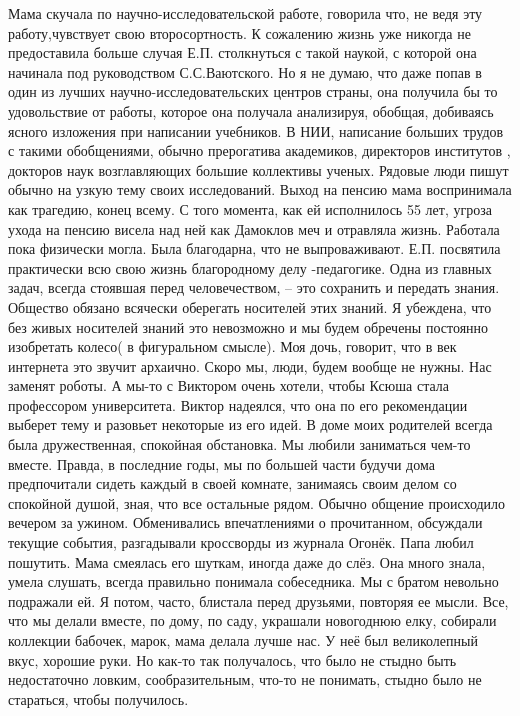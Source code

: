 Мама скучала по научно-исследовательской работе, говорила что, не ведя эту работу,чувствует свою второсортность. К сожалению жизнь уже никогда не предоставила больше случая Е.П. столкнуться с такой наукой, с которой она начинала под руководством С.С.Ваютского. Но я не думаю, что даже попав в один из лучших научно-исследовательских центров страны, она получила бы то удовольствие от работы, которое она получала анализируя, обобщая, добиваясь ясного изложения при написании учебников. В НИИ, написание больших трудов с такими обобщениями, обычно прерогатива академиков, директоров институтов , докторов наук возглавляющих большие коллективы ученых. Рядовые люди пишут обычно на узкую тему своих исследований.
Выход на пенсию мама воспринимала как трагедию, конец всему. С того момента, как ей исполнилось 55 лет, угроза ухода на пенсию висела над ней как Дамоклов меч и отравляла жизнь. Работала пока физически могла. Была благодарна, что не выпроваживают.
Е.П. посвятила практически всю свою жизнь благородному делу -педагогике. Одна из главных задач, всегда стоявшая перед человечеством, – это сохранить и передать знания. Общество обязано всячески оберегать носителей этих знаний. Я убеждена, что без живых носителей знаний это невозможно и мы будем обречены постоянно изобретать колесо( в фигуральном смысле). Моя дочь, говорит, что в век интернета это звучит архаично. Скоро мы, люди, будем вообще не нужны. Нас заменят роботы. А мы-то с Виктором очень хотели, чтобы Ксюша стала профессором университета. Виктор надеялся, что она по его рекомендации выберет тему и разовьет некоторые из его идей.
В доме моих родителей всегда была дружественная, спокойная обстановка. Мы любили заниматься чем-то вместе. Правда, в последние годы, мы по большей части будучи дома предпочитали сидеть каждый в своей комнате, занимаясь своим делом со спокойной душой, зная, что все остальные рядом.
Обычно общение происходило вечером за ужином. Обменивались впечатлениями о прочитанном, обсуждали текущие события, разгадывали кроссворды из журнала Огонёк. Папа любил пошутить. Мама  смеялась его шуткам,  иногда даже до слёз. Она много знала, умела слушать, всегда правильно понимала собеседника. Мы с братом невольно подражали ей. Я потом, часто, блистала перед друзьями, повторяя ее мысли.
Все, что мы делали вместе, по дому, по саду, украшали новогоднюю елку, собирали коллекции бабочек, марок, мама делала лучше нас. У неё был великолепный вкус, хорошие руки. Но как-то так получалось, что было не стыдно быть недостаточно ловким, сообразительным, что-то не понимать, стыдно было не стараться, чтобы получилось.
